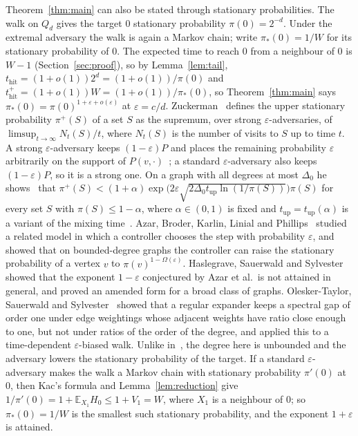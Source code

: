 \documentclass[11pt]{amsart}
\theoremstyle{remark}
\newcommand{\eps}{\varepsilon}
\newcommand{\E}{\mathbb{E}}
\newcommand{\thit}{t_{\mathrm{hit}}}
\begin{document}
Theorem~\ref{thm:main} can also be stated through stationary probabilities. The walk on $Q_d$ gives the target $0$
stationary probability $\pi(0)=2^{-d}$. Under the extremal adversary the walk is again a Markov
chain; write $\pi_*(0)=1/W$ for its stationary probability of $0$. The expected time to reach $0$ from a neighbour of $0$ is $W-1$ (Section~\ref{sec:proof}), so by
Lemma~\ref{lem:tail},
$\thit=(1+o(1))2^d=(1+o(1))/\pi(0)$ and $\thit^+=(1+o(1))W=(1+o(1))/\pi_*(0)$, so Theorem~\ref{thm:main} says
$\pi_*(0)=\pi(0)^{1+\eps+o(\eps)}$ at $\eps=c/d$. Zuckerman~\cite[Definition~1.1]{Zuc26} defines the upper stationary
probability $\pi^+(S)$ of a set $S$ as the supremum, over strong $\eps$-adversaries, of $\limsup_{t\to\infty}N_t(S)/t$,
where $N_t(S)$ is the number of visits to $S$ up to time $t$. A strong $\eps$-adversary keeps $(1-\eps)P$ and places the
remaining probability $\eps$ arbitrarily on the support of $P(v,\cdot)$~\cite[Section~1.1]{Zuc26}; a standard
$\eps$-adversary also keeps $(1-\eps)P$, so it is a strong one. On a graph with all degrees at most $\Delta_0$ he shows~\cite[Theorem~1.2]{Zuc26} that
$\pi^+(S)<(1+\alpha)\exp\bigl(2\eps\sqrt{2\Delta_0t_{\mathrm{up}}\ln(1/\pi(S))}\bigr)\pi(S)$ for every set $S$ with
$\pi(S)\le1-\alpha$, where $\alpha\in(0,1)$ is fixed and $t_{\mathrm{up}}=t_{\mathrm{up}}(\alpha)$ is a variant of the
mixing time~\cite[Section~2.3]{Zuc26}. Azar, Broder,
Karlin, Linial and Phillips~\cite{ABKLP96} studied a related model in which a controller chooses the step with
probability $\eps$, and showed that on bounded-degree graphs the controller can raise the stationary probability of a
vertex $v$ to $\pi(v)^{1-\Omega(\eps)}$. Haslegrave, Sauerwald and Sylvester~\cite{HSS22} showed that the exponent
$1-\eps$ conjectured by Azar et al.\ is not attained in general, and proved an amended form for a broad class of
graphs. Olesker-Taylor, Sauerwald and Sylvester~\cite{OSS26} showed that a regular expander keeps a spectral gap of order
one under edge weightings whose adjacent weights have ratio close enough to one, but not under ratios of the
order of the degree, and applied this to a time-dependent $\eps$-biased walk. Unlike in~\cite{ABKLP96}, the degree here is unbounded and the adversary lowers the stationary probability of the
target. If a standard $\eps$-adversary makes the walk a Markov chain with stationary probability $\pi'(0)$ at $0$, then Kac's formula and Lemma~\ref{lem:reduction} give $1/\pi'(0)=1+\E_{X_1}H_0\le1+V_1=W$, where $X_1$ is a neighbour of $0$; so $\pi_*(0)=1/W$ is the smallest such stationary probability, and the exponent $1+\eps$ is attained.
\end{document}
